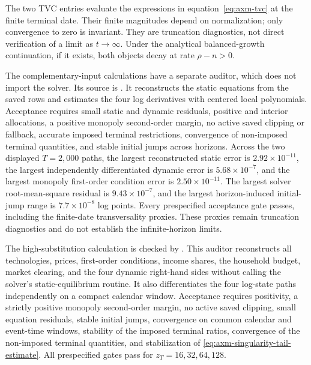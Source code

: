 The two TVC entries evaluate the expressions in equation~\eqref{eq:axm-tvc} at
the finite terminal date. Their finite magnitudes depend on normalization; only
convergence to zero is invariant. They are truncation diagnostics, not direct
verification of a limit as \(t\to\infty\). Under the analytical balanced-growth
continuation, if it exists, both objects decay at rate \(\rho-n>0\).

The complementary-input calculations have a separate auditor, which does not
import the solver. Its source is
. It
reconstructs the static equations from the saved rows and estimates the four log
derivatives with centered local polynomials. Acceptance requires small static and
dynamic residuals, positive and interior allocations, a positive monopoly
second-order margin, no active saved clipping or fallback, accurate imposed
terminal restrictions, convergence of non-imposed terminal quantities, and
stable initial jumps across horizons.
Across the two displayed \(T=2{,}000\) paths, the largest reconstructed static
error is \(2.92\times10^{-11}\), the largest independently differentiated
dynamic error is \(5.68\times10^{-7}\), and the largest monopoly first-order
condition error is \(2.50\times10^{-11}\). The largest solver root-mean-square
residual is \(9.43\times10^{-7}\), and the largest horizon-induced initial-jump
range is \(7.7\times10^{-8}\) log points. Every prespecified acceptance gate
passes, including the finite-date transversality proxies. These proxies remain
truncation diagnostics and do not establish the infinite-horizon limits.

The high-substitution calculation is checked by
. This auditor reconstructs all
technologies, prices, first-order conditions, income shares, the household
budget, market clearing, and the four dynamic right-hand sides without calling
the solver's static-equilibrium routine. It also differentiates the four
log-state paths independently on a compact calendar window. Acceptance requires positivity,
a strictly positive monopoly second-order margin, no active saved clipping,
small equation residuals, stable initial jumps, convergence on common calendar
and event-time windows, stability of the imposed terminal ratios, convergence of
the non-imposed terminal quantities, and stabilization of
\eqref{eq:axm-singularity-tail-estimate}. All prespecified gates pass for
\(z_T=16,32,64,128\).

